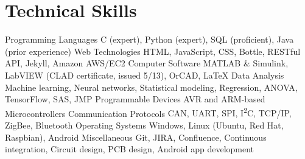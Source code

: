 \section{Technical Skills}
\begin{cvskills}
  \cvskill
    {Programming Languages}
    {C (expert), Python (expert), SQL (proficient), Java (prior experience)}
  \cvskill
    {Web Technologies}
    {HTML, JavaScript, CSS, Bottle, RESTful API, Jekyll, Amazon AWS/EC2}
  \cvskill
    {Computer Software}
    {MATLAB \& Simulink, LabVIEW (CLAD certificate, issued 5/13), OrCAD, LaTeX}
  \cvskill
    {Data Analysis}
    {Machine learning, Neural networks, Statistical modeling, Regression, ANOVA, TensorFlow, SAS, JMP}
  \cvskill
    {Programmable Devices}
    {AVR and ARM-based Microcontrollers}
  \cvskill
    {Communication Protocols}
    {CAN, UART, SPI, I\textsuperscript{2}C, TCP/IP, ZigBee, Bluetooth}
  \cvskill
    {Operating Systems}
    {Windows, Linux (Ubuntu, Red Hat, Raspbian), Android}
  \cvskill
    {Miscellaneous}
    {Git, JIRA, Confluence, Continuous integration, Circuit design, PCB design, Android app development}
\end{cvskills} 